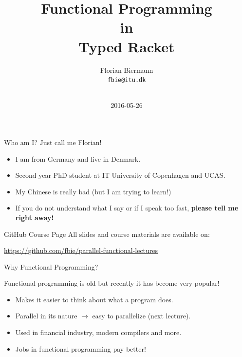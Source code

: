 \documentclass{beamer}
\title{Functional Programming\\ in\\ Typed Racket}
\author{Florian Biermann \\\small{\texttt{fbie@itu.dk}} \\~}
\institute{IT University of Copenhagen \& UCAS}
\date{2016-05-26}
\begin{document}
\begin{frame}
  \titlepage{}
\end{frame}

\begin{frame}{Who am I?}
  Just call me Florian!

  \begin{itemize}
  \pause{} \item I am from Germany and live in Denmark.
  \pause{} \item Second year PhD student at IT University of Copenhagen and UCAS.
  \pause{} \item My Chinese is really bad (but I am trying to learn!)
  \pause{} \item If you do not understand what I say or if I speak too fast, \textbf{please tell me right away!}
  \end{itemize}
\end{frame}

\begin{frame}{GitHub Course Page}
  All slides and course materials are available on:

  \begin{center}
    \url{https://github.com/fbie/parallel-functional-lectures}
  \end{center}
\end{frame}

\begin{frame}{Why Functional Programming?}

  Functional programming is old but recently it has become very popular!

  \begin{itemize}
  \pause{} \item Makes it easier to think about what a program does.
  \pause{} \item Parallel in its nature $\rightarrow$ easy to parallelize (next lecture).
  \pause{} \item Used in financial industry, modern compilers and more.
  \pause{} \item Jobs in functional programming pay better!
  \end{itemize}

\end{frame}
\end{document}
